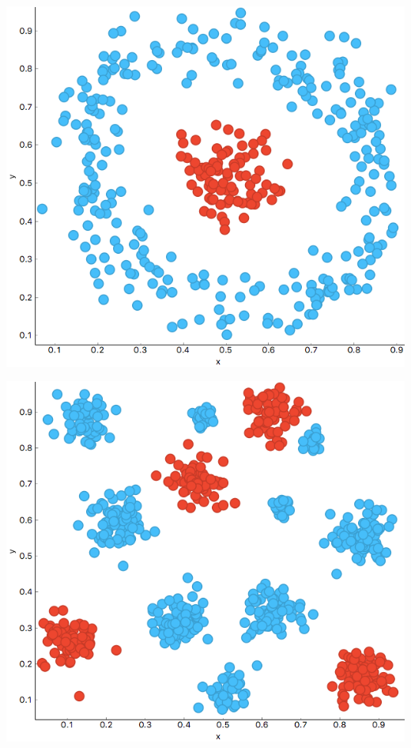 \begin{marginfigure}
    \centering
    \includegraphics[width=\linewidth]{C.png}
    \caption{$\;$}
\end{marginfigure}

\begin{marginfigure}
    \centering
    \includegraphics[width=\linewidth]{D.png}
    \caption{$\;$}
\end{marginfigure}

